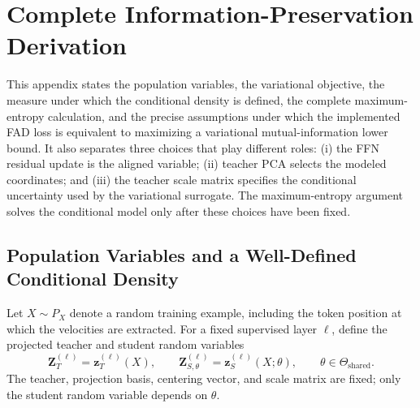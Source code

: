 \documentclass{article}
\newcommand{\bz}{\boldsymbol{z}}
\theoremstyle{plain}
\theoremstyle{definition}
\theoremstyle{remark}
\begin{document}
\clearpage
\section{Complete Information-Preservation Derivation}
\label{app:maxent-derivation}

This appendix states the population variables, the variational objective, the
measure under which the conditional density is defined, the complete
maximum-entropy calculation, and the precise assumptions under which the
implemented FAD loss is equivalent to maximizing a variational mutual-information
lower bound.  It also separates three choices that play different roles:
(i) the FFN residual update is the aligned variable; (ii) teacher PCA selects the
modeled coordinates; and (iii) the teacher scale matrix specifies the conditional
uncertainty used by the variational surrogate.  The maximum-entropy argument
solves the conditional model only after these choices have been fixed.

\subsection{Population Variables and a Well-Defined Conditional Density}
\label{app:population-formulation}

Let $X\sim P_X$ denote a random training example, including the token position at
which the velocities are extracted.  For a fixed supervised layer $\ell$, define
the projected teacher and student random variables
\begin{equation}
  \boldsymbol{Z}_T^{(\ell)}=\bz_T^{(\ell)}(X),
  \qquad
  \boldsymbol{Z}_{S,\theta}^{(\ell)}=\bz_S^{(\ell)}(X;\theta),
  \qquad \theta\in\Theta_{\mathrm{shared}}.
  \label{eq:app-population-codes}
\end{equation}
The teacher, projection basis, centering vector, and scale matrix are fixed;
only the student random variable depends on $\theta$.
\end{document}
